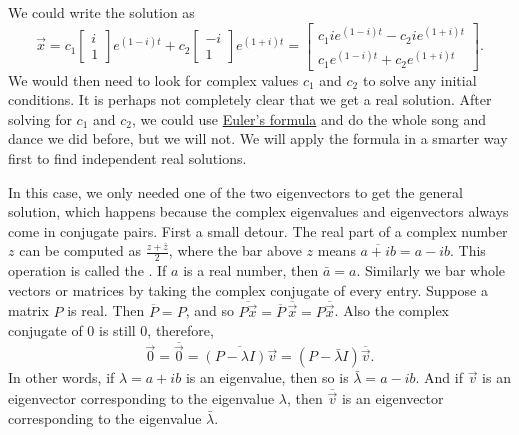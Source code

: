 \documentclass{ximera}
\begin{document}
We could write the solution as
\begin{equation*}
    \vec{x} = c_1 
    \begin{bmatrix} 
        i \\ 
        1 
    \end{bmatrix} 
    e^{(1-i)t} + c_2 
    \begin{bmatrix} 
        -i \\ 
        1 
    \end{bmatrix} 
    e^{(1+i)t} =
    \begin{bmatrix}
        c_1 i e^{(1-i)t} - c_2 i e^{(1+i)t} \\
        c_1 e^{(1-i)t} + c_2 e^{(1+i)t}
    \end{bmatrix} .
\end{equation*}
We would then need to look for complex values $c_1$ and $c_2$ to solve any initial conditions.  It is perhaps not completely clear that we get a real solution.  After solving for $c_1$ and $c_2$, we could use \hyperref[eulersformula]{Euler's formula} and do the whole song and dance we did before, but we will not. We will apply the formula in a smarter way first to find independent real solutions.

In this case, we only needed one of the two eigenvectors to get the general solution, which happens because the complex eigenvalues and eigenvectors always come in conjugate pairs. First a small detour.  The real part of a complex number $z$ can be computed as $\frac{z + \bar{z}}{2}$, where the bar above $z$ means $\overline{a+ib} = a -ib$.  This operation is called the \emph{}. If $a$ is a real number, then $\bar{a} = a$. Similarly we bar whole vectors or matrices by taking the complex conjugate of every entry. Suppose a matrix $P$ is real. Then $\overline{P} = P$, and so $\overline{P\vec{x}} = \overline{P} \, \overline{\vec{x}} = P \overline{\vec{x}}$. Also the complex conjugate of 0 is still 0, therefore,
\begin{equation*}
    \vec{0} = \overline{\vec{0}} =  \overline{(P-\lambda I)\vec{v}} = (P-\bar{\lambda} I)\overline{\vec{v}} .
\end{equation*}
In other words, if $\lambda = a+ib$ is an eigenvalue, then so is $\bar{\lambda} = a-ib$. And if $\vec{v}$ is an eigenvector corresponding to the eigenvalue $\lambda$, then $\overline{\vec{v}}$ is an eigenvector corresponding to the eigenvalue $\bar{\lambda}$.  
\end{document}
